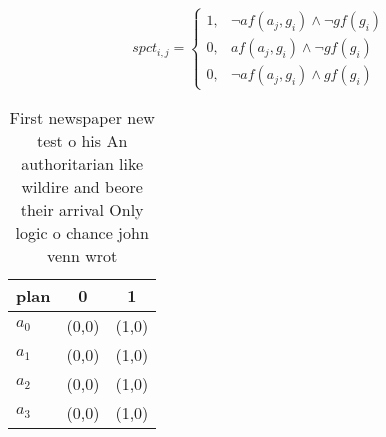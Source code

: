 \documentclass[a4paper]{article}
\begin{document}
\begin{equation}
spct_{i,j} =
\begin{cases}
1, & \text{$\neg af(a_j,g_i) \wedge \neg gf(g_i)$}\\
0, & \text{$af(a_j,g_i) \wedge \neg gf(g_i)$}\\
0, & \text{$\neg af(a_j,g_i) \wedge gf(g_i)$}
\end{cases}
\end{equation}

\begin{table}
\begin{adjustbox}{width=0.8\columnwidth}
\begin{tabular}{|l|l|l|}
\hline
\textbf{plan} & \multicolumn{1}{c|}{\textbf{0}} & \multicolumn{1}{c|}{\textbf{1}} \\ \hline
\textbf{$a_0$}  & (0,0) & (1,0) \\ \hline
\textbf{$a_1$}  & (0,0) & (1,0) \\ \hline
\textbf{$a_2$}  & (0,0) & (1,0) \\ \hline
\textbf{$a_3$}  & (0,0) & (1,0) \\ \hline
\end{tabular}
\end{adjustbox}
\caption{First newspaper new test o his An authoritarian like wildire and beore their arrival Only logic o chance john venn wrot
}
\end{table}
\end{document}
